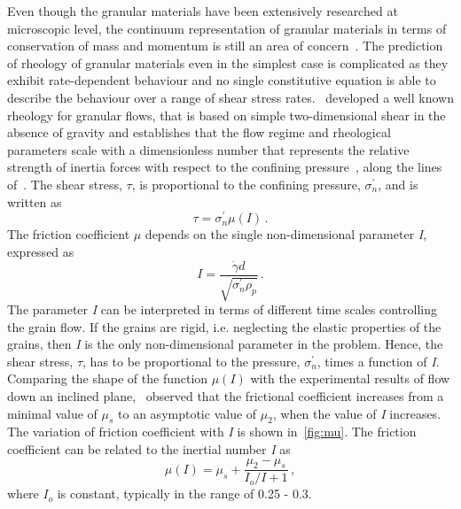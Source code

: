 Even though the granular materials have been extensively researched at 
microscopic level, the continuum representation of granular materials in terms 
of conservation of mass and momentum is still an area of 
concern~\citep{Midi2004,Daniel2007}. The prediction of rheology of granular 
materials even in the simplest case is complicated as they exhibit 
rate-dependent behaviour and no single constitutive equation is able to 
describe the behaviour over a range of shear stress rates.~\citet{DaCruz2005} 
developed a well known rheology for granular flows, that is based on 
simple two-dimensional shear in the absence of gravity and establishes that the 
flow regime and rheological parameters scale with a dimensionless number that 
represents the relative strength of inertia forces with respect to the 
confining pressure~\citep{Daniel2007}, along the lines of~\citet{Savage1991}. 
The shear stress, $\tau$, is proportional to the confining pressure, 
$\sigma_n^\prime$, and is written as
%
\begin{equation}
\tau = \sigma_n^\prime \mu (\mathit{I}) \,.
\end{equation}
%
The friction coefficient $\mu$ depends on the single non-dimensional parameter 
\textit{I}, expressed as
\begin{equation}
\textit{I} = \frac{\dot{\gamma}d}{\sqrt{ \sigma_n^\prime\rho_{\mathit{p}}}} \,.
\end{equation}
%
The parameter \textit{I} can be interpreted in terms of different time scales 
controlling the grain flow. If the grains are rigid, i.e. neglecting the 
elastic properties of the grains, then \textit{I} is the only 
non-dimensional parameter in the problem. Hence, the shear stress, $\tau$, has 
to be proportional to the pressure, $\sigma_n^\prime$, times a function of 
\textit{I}. Comparing the shape of the function $\mu(\mathit{I})$ with the 
experimental results of flow down an inclined plane,~\citet{Jop2006} observed 
that the frictional coefficient increases from a minimal value of 
$\mu_{\mathit{s}}$ to an asymptotic value of $\mu_{2}$, when the value of 
\textit{I} increases. The variation of friction coefficient with \textit{I} is 
shown in~\cref{fig:mu}. The friction coefficient can be related to the inertial 
number \textit{I} as
%
\begin{equation}
\mu(I) = \mu_s + \frac{\mu_2 - \mu_s}{I_o/I+1} \,,
\end{equation}
%
where $I_o$ is constant, typically in the range of 0.25 - 0.3. 

